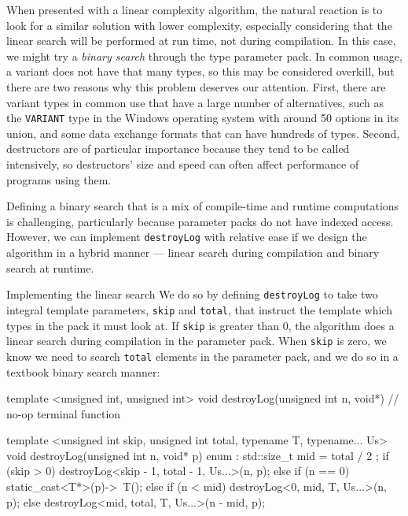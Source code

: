 \noindent When presented with a linear complexity algorithm, the natural reaction
is to look for a similar solution with lower complexity, especially
considering that the linear search will be performed at run time, not
during compilation. In this case, we might try a \emph{binary search}
through the type parameter pack. In common usage, a variant does not
have that many types, so this may be considered overkill, but there are
two reasons why this problem deserves our attention. First, there are
variant types in common use that have a large number of alternatives,
such as the \lstinline!VARIANT! type in the Windows operating system with
around 50 options in its union, and some data exchange formats that can
have hundreds of types. Second, destructors are of particular importance
because they tend to be called intensively, so destructors' size and
speed can often affect performance of programs using them.

Defining a binary search that is a mix of compile-time and runtime
computations is challenging, particularly because parameter packs do not
have indexed access. However, we can implement \lstinline!destroyLog! with
relative ease if we design the algorithm in a hybrid manner --- linear
search during compilation and binary search at runtime.

Implementing the linear search We do so by
defining \lstinline!destroyLog! to take two integral template parameters,
\lstinline!skip! and \lstinline!total!, that instruct the template which types
in the pack it must look at. If \lstinline!skip! is greater than 0, the
algorithm does a linear search during compilation in the parameter pack.
When \lstinline!skip! is zero, we know we need to search \lstinline!total!
elements in the parameter pack, and we do so in a textbook binary search
manner:

\begin{emcppslisting}[emcppsbatch={e38,e39}]
template <unsigned int, unsigned int>
void destroyLog(unsigned int n, void*) // no-op terminal function
{ }

template <unsigned int skip, unsigned int total, typename T, typename... Us>
void destroyLog(unsigned int n, void* p)
{
    enum : std::size_t { mid = total / 2 };
    if (skip > 0)
        destroyLog<skip - 1, total - 1, Us...>(n, p);
    else if (n == 0)
        static_cast<T*>(p)->~T();
    else if (n < mid)
        destroyLog<0, mid, T, Us...>(n, p);
    else
        destroyLog<mid, total, T, Us...>(n - mid, p);
}
\end{emcppslisting}
    

